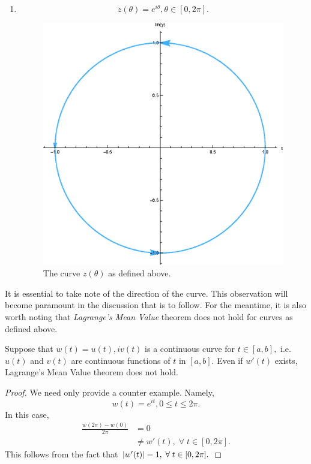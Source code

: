 \documentclass[12pt]{book}
\begin{document}
\begin{enumerate}[label = {(\roman*)}]
        \item
        \[
            z(\theta) = e^{i\theta}, \theta \in [0, 2\pi].
        \]
        \begin{figure}[H]
            \centering
            \includegraphics[scale = 0.7]{./figs/chapter_2/curve_ex_2.eps}
            \caption{The curve $z(\theta)$ as defined above.}
        \end{figure}
\end{enumerate}
It is essential to take note of the direction of the curve. This observation will become paramount in the discussion that is to follow. For the meantime,  it is also worth noting that \textit{Lagrange's Mean Value} theorem does not hold for curves as defined above.
\begin{thm}
    Suppose that $w(t) = u(t), iv(t)$ is a continuous curve for $t \in [a, b],$ i.e. $u(t)$ and $v(t)$ are continuous functions of $t$ in $[a, b]$. Even if $w'(t)$ exists, Lagrange's Mean Value theorem does not hold.
\end{thm}
\begin{proof}
    We need only provide a counter example. Namely,
    \[
        w(t) = e^{it}, 0 \leq t \leq 2\pi.
    \]
    In this case,
    \begin{align*}
        \frac{w(2\pi) - w(0)}{2\pi}
            &=
                0 \\
            &\neq
                w'(t), \;\forall\; t \in [0, 2\pi].
    \end{align*}
    This follows from the fact that $\left\lvert w'(t) \right\rvert = 1, \;\forall\; t \in [0, 2\pi].$
\end{proof}
\end{document}
